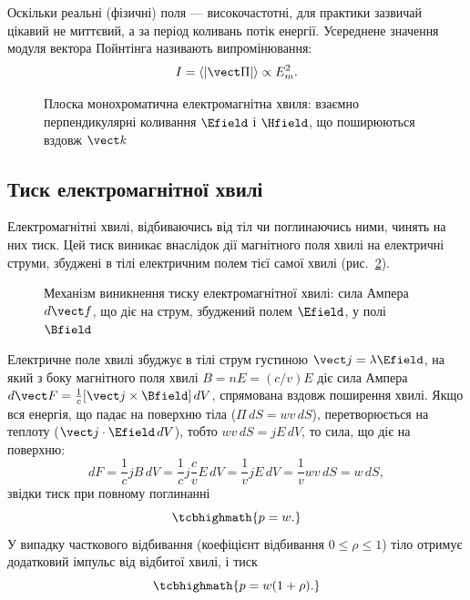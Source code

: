 Оскільки реальні (фізичні) поля --- високочастотні, для практики зазвичай цікавий не миттєвий, а  за період коливань потік
енергії. Усереднене значення модуля вектора Пойнтінга називають  випромінювання:
\begin{equation}\label{eq:Intensity}
	I = \left\langle|\vect\Pi|\right\rangle \propto E_m^2.
\end{equation}

\begin{figure}[h!]\centering
	\caption{Плоска монохроматична електромагнітна хвиля: взаємно перпендикулярні коливання
		$\Efield$ і $\Hfield$, що поширюються вздовж $\vect k$\label{pic:EMWave}}
\end{figure}

\subsection*{Тиск електромагнітної хвилі}

Електромагнітні хвилі, відбиваючись від тіл чи поглинаючись ними, чинять на них тиск. Цей тиск виникає внаслідок дії магнітного поля хвилі на
електричні струми, збуджені в тілі електричним полем тієї самої хвилі (рис.~\ref{pic:EMPressure}).

\begin{figure}[h!]\centering
	\caption{Механізм виникнення тиску електромагнітної хвилі: сила Ампера $d\vect f$, що діє на
		струм, збуджений полем $\Efield$, у полі $\Bfield$\label{pic:EMPressure}}
\end{figure}

Електричне поле хвилі збуджує в тілі струм густиною $\vect j=\lambda\Efield$, на який з боку магнітного поля хвилі $B=nE=(c/v)E$ діє сила Ампера
$d\vect F = \tfrac1c[\vect j\times\Bfield]\,dV$, спрямована вздовж поширення хвилі. Якщо вся енергія, що падає на поверхню тіла ($\Pi\, dS = wv\,
dS$), перетворюється на теплоту ($\vect j\cdot\Efield\, dV$), тобто $wv\,dS = jE\,dV$, то сила, що діє на поверхню:
\begin{equation}\label{eq:RadiationForce}
	dF = \frac1c jB\,dV = \frac1c j\frac{c}{v}E\,dV = \frac1v jE\,dV = \frac1v wv\,dS = w\,dS,
\end{equation}
звідки тиск при повному поглинанні
\begin{equation}\label{eq:RadiationPressureFull}
	\tcbhighmath{
		p = w.
	}
\end{equation}
У випадку часткового відбивання (коефіцієнт відбивання $0\leq\rho\leq1$) тіло отримує додатковий імпульс від відбитої хвилі, і тиск
\begin{equation}\label{eq:RadiationPressurePartial}
	\tcbhighmath{
		p = w(1+\rho).
	}
\end{equation}

